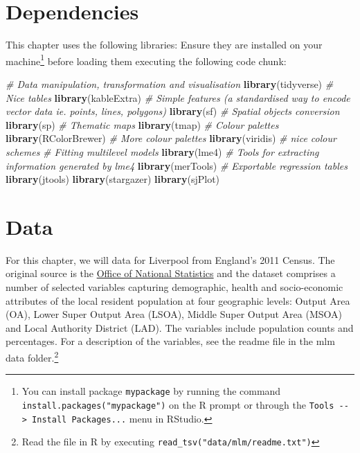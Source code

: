 \documentclass[]{book}
\newenvironment{Shaded}{\begin{snugshade}}{\end{snugshade}}
\newcommand{\KeywordTok}[1]{\textcolor[rgb]{0.13,0.29,0.53}{\textbf{#1}}}
\newcommand{\CommentTok}[1]{\textcolor[rgb]{0.56,0.35,0.01}{\textit{#1}}}
\newcommand{\NormalTok}[1]{#1}
\begin{document}
\section{Dependencies}\label{dependencies-4}

This chapter uses the following libraries: Ensure they are installed on
your machine\footnote{You can install package \texttt{mypackage} by
  running the command \texttt{install.packages("mypackage")} on the R
  prompt or through the
  \texttt{Tools\ -\/-\textgreater{}\ Install\ Packages...} menu in
  RStudio.} before loading them executing the following code chunk:

\begin{Shaded}
\begin{Highlighting}[]
\CommentTok{# Data manipulation, transformation and visualisation}
\KeywordTok{library}\NormalTok{(tidyverse)}
\CommentTok{# Nice tables}
\KeywordTok{library}\NormalTok{(kableExtra)}
\CommentTok{# Simple features (a standardised way to encode vector data ie. points, lines, polygons)}
\KeywordTok{library}\NormalTok{(sf) }
\CommentTok{# Spatial objects conversion}
\KeywordTok{library}\NormalTok{(sp) }
\CommentTok{# Thematic maps}
\KeywordTok{library}\NormalTok{(tmap) }
\CommentTok{# Colour palettes}
\KeywordTok{library}\NormalTok{(RColorBrewer) }
\CommentTok{# More colour palettes}
\KeywordTok{library}\NormalTok{(viridis) }\CommentTok{# nice colour schemes}
\CommentTok{# Fitting multilevel models}
\KeywordTok{library}\NormalTok{(lme4)}
\CommentTok{# Tools for extracting information generated by lme4}
\KeywordTok{library}\NormalTok{(merTools)}
\CommentTok{# Exportable regression tables}
\KeywordTok{library}\NormalTok{(jtools)}
\KeywordTok{library}\NormalTok{(stargazer)}
\KeywordTok{library}\NormalTok{(sjPlot)}
\end{Highlighting}
\end{Shaded}

\section{Data}\label{data-3}

For this chapter, we will data for Liverpool from England's 2011 Census.
The original source is the
\href{https://www.nomisweb.co.uk/home/census2001.asp}{Office of National
Statistics} and the dataset comprises a number of selected variables
capturing demographic, health and socio-economic attributes of the local
resident population at four geographic levels: Output Area (OA), Lower
Super Output Area (LSOA), Middle Super Output Area (MSOA) and Local
Authority District (LAD). The variables include population counts and
percentages. For a description of the variables, see the readme file in
the mlm data folder.\footnote{Read the file in R by executing
  \texttt{read\_tsv("data/mlm/readme.txt")}}
\end{document}
